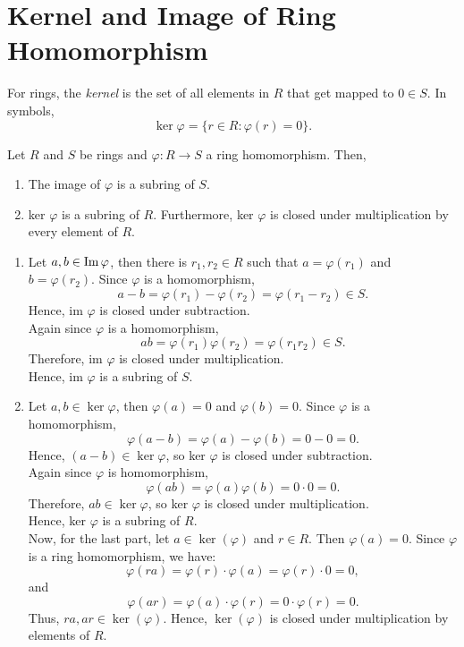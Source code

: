 \section{Kernel and Image of Ring Homomorphism}
\begin{definition}
    For rings, the \textit{kernel} is the set of all elements in $R$ that get mapped to $0 \in S$. In symbols,
    \[\ker \varphi = \{r \in R: \varphi(r) = 0\}.\]
\end{definition}
\begin{prop}
    \label{def:kernelisideal}
    Let $R$ and $S$ be rings and $\varphi: R \rightarrow S$ a ring homomorphism. Then,
    \begin{enumerate}
        \item The image of $\varphi$ is a subring of $S$.
        \item ker $\varphi$ is a subring of $R$. Furthermore, ker $\varphi$ is closed under multiplication by every element of $R$.
    \end{enumerate}
\end{prop}
\begin{propproof}
    \begin{enumerate}
        \item Let $a, b \in \operatorname{Im} \varphi$, then there is $r_1, r_2 \in R$ such that $a = \varphi(r_1)$ and $b = \varphi(r_2)$. Since $\varphi$ is a homomorphism,
        \[a - b = \varphi(r_1) - \varphi(r_2) = \varphi(r_1 - r_2) \in S.\]
        Hence, im $\varphi$ is closed under subtraction.\\
        Again since $\varphi$ is a homomorphism,
        \[ab = \varphi(r_1)  \varphi(r_2) = \varphi(r_1  r_2) \in S.\]
        Therefore, im $\varphi$ is closed under multiplication.\\
        Hence, im $\varphi$ is a subring of $S$.
        \item Let $a, b \in \ker \varphi$, then $\varphi(a) = 0$ and $\varphi(b) = 0$. Since $\varphi$ is a homomorphism,
        \[\varphi(a - b) = \varphi(a) - \varphi(b) = 0 - 0 = 0.\]
        Hence, $(a-b) \in \ker \varphi$, so ker $\varphi$ is closed under subtraction.\\
        Again since $\varphi$ is homomorphism,
        \[\varphi(ab) = \varphi(a)\varphi(b) = 0 \cdot 0 = 0.\]
        Therefore, $ab \in \ker \varphi$, so ker $\varphi$ is closed under multiplication.\\
        Hence, ker $\varphi$ is a subring of $R$.\\
        Now, for the last part, let \( a \in \ker(\varphi) \) and \( r \in R \). Then \( \varphi(a) = 0 \). Since \( \varphi \) is a ring homomorphism, we have:
        \[
        \varphi(ra) = \varphi(r) \cdot \varphi(a) = \varphi(r) \cdot 0= 0,
        \]
        and
        \[
        \varphi(ar) = \varphi(a) \cdot \varphi(r) = 0 \cdot \varphi(r) = 0.
        \]
        Thus, \( ra, ar \in \ker(\varphi) \). Hence, \( \ker(\varphi) \) is closed under multiplication by elements of \( R \).
    \end{enumerate}
\end{propproof}